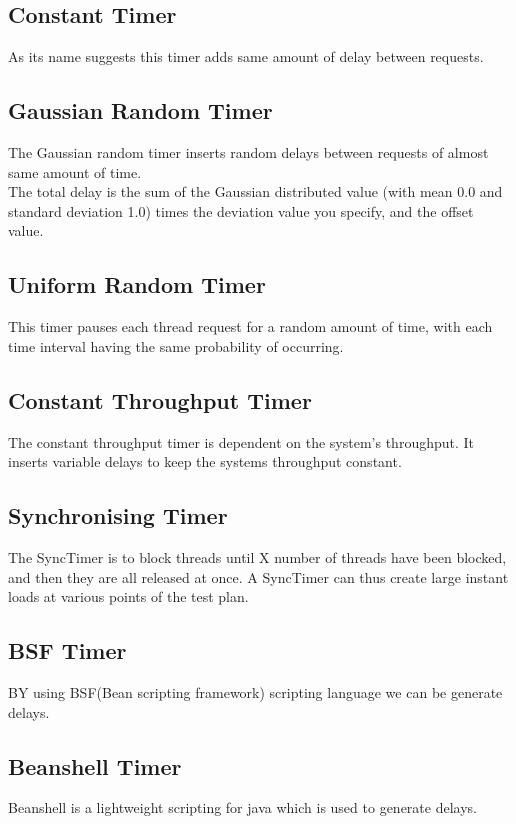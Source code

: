 \documentclass[12pt]{book}
\begin{document}
  \subsection{Constant Timer}
  As its name suggests this timer adds same amount of delay between requests.
  
  \subsection{Gaussian Random Timer}
  The Gaussian random timer inserts random delays between requests of almost same amount of time.\\
  The total delay is the sum of the Gaussian distributed value (with mean 0.0 and standard deviation 1.0)
  times the deviation value you specify, and the offset value. 
  
  \subsection{Uniform Random Timer}
  This timer pauses each thread request for a random amount of time, with each time interval having the same probability of occurring.
  
  \subsection{Constant Throughput Timer}
  The constant throughput timer is dependent on the system’s throughput. It inserts variable delays to keep the systems throughput constant.
  
  \subsection{Synchronising Timer}
  The SyncTimer is to block threads until X number of threads have been blocked, and then they are all released at once. 
  A SyncTimer can thus create large instant loads at various points of the test plan.
  
  \subsection{BSF Timer}
  BY using BSF(Bean scripting framework) scripting language we can be generate delays.
  
  \subsection{Beanshell Timer}
  Beanshell is a lightweight scripting for java which is used to generate delays.
  
\end{document}
